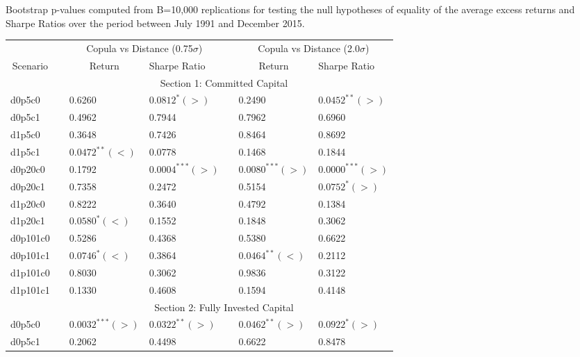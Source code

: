 \documentclass[a4paper]{article}
\begin{document}
	\medskip
	
	\begin{threeparttable}[H]
		\centering \scriptsize
		\caption{Bootstrap p-values computed from B=10,000 replications for testing the null hypotheses of equality of the average excess returns and Sharpe Ratios over the period between July 1991 and December 2015.}
		\begin{tabularx}{\textwidth}{@{\extracolsep{\fill}}lllllll@{}}
			\toprule
			& & \multicolumn{2}{c}{Copula vs Distance (0.75$\sigma$)} & \multicolumn{1}{c}{} & \multicolumn{2}{c}{Copula vs Distance (2.0$\sigma$)} \\
			\cmidrule{3-4}  \cmidrule{6-7}
			\multicolumn{1}{c}{Scenario} & & \multicolumn{1}{c}{Return} & Sharpe Ratio &       & \multicolumn{1}{c}{Return}& Sharpe Ratio \\
			\midrule
			& \multicolumn{6}{c}{Section 1: Committed Capital} \\
			\midrule
					d0p5c0 & & 0.6260 & $0.0812^{*}(>)$ &       & 0.2490 & $0.0452^{**}(>)$ \\
			d0p5c1 & & 0.4962 & 0.7944 &       & 0.7962 & 0.6960 \\
			d1p5c0 & & 0.3648 & 0.7426 &       & 0.8464 & 0.8692 \\
			d1p5c1 & & $0.0472^{**}(<)$ & 0.0778 &       & 0.1468 & 0.1844 \\
			d0p20c0 & & 0.1792 & $0.0004^{***}(>)$ &       & $0.0080^{***}(>)$ & $0.0000^{***}(>)$ \\
			d0p20c1 & & 0.7358 & 0.2472 &       & 0.5154 & $0.0752^{*}(>)$ \\
			d1p20c0 & & 0.8222 & 0.3640 &       & 0.4792 & 0.1384 \\
			d1p20c1 & & $0.0580^{*}(<)$ & 0.1552 &       & 0.1848 & 0.3062 \\
			d0p101c0 & & 0.5286 & 0.4368 &       & 0.5380 & 0.6622 \\
			d0p101c1 & & $0.0746^{*}(<)$ & 0.3864 &       & $0.0464^{**}(<)$ & 0.2112 \\
			d1p101c0 & & 0.8030 & 0.3062 &       & 0.9836 & 0.3122 \\
			d1p101c1 & & 0.1330 & 0.4608 &       & 0.1594 & 0.4148 \\
			\midrule
			& \multicolumn{6}{c}{Section 2: Fully Invested Capital} \\
			\midrule
			d0p5c0 & & $0.0032^{***}(>)$ & $0.0322^{**}(>)$ &       & $0.0462^{**}(>)$ & $0.0922^{*}(>)$ \\
			d0p5c1 & & 0.2062 & 0.4498 &       & 0.6622 & 0.8478 \\

\end{tabularx}
\end{threeparttable}
\end{document}

